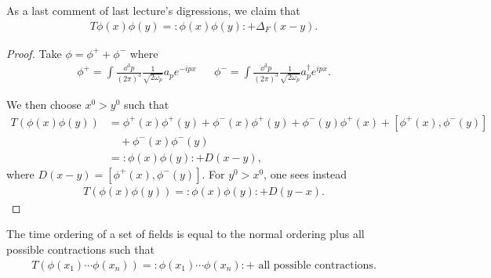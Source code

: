 

\newcommand{\nord}[1]{:\mathrel{#1}:}

\begin{claim}
    As a last comment of last lecture's digressions, we claim that
\begin{align}
    T \phi \left( x \right) \phi \left( y \right) = \nord{ \phi \left( x \right) \phi \left( y \right) } + \Delta_F \left( x - y \right) 
.\end{align}
\end{claim}


\begin{proof}
    Take $\phi = \phi^{+} + \phi^{-}$ where
    \begin{align}
        \phi^{+} = \int \frac{\dd{^3p}}{\left( 2\pi \right)^3} \frac{1}{\sqrt{2\omega_p} } a_p e^{-i p x} && \phi^{-} = \int \frac{\dd{^3p}}{\left( 2\pi \right)^3} \frac{1}{\sqrt{2\omega_p} } a_p^{\dag} e^{i px}
    .\end{align}

    We then choose $x^{0} > y^{0}$ such that
    \begin{align}
        T \left( \phi \left( x \right) \phi \left( y \right)  \right) &= \phi^{+} \left( x \right) \phi^{+} \left( y \right) + \phi^{-}\left( x \right) \phi^{+}\left( y \right) + \phi^{-}\left( y \right) \phi^{+}\left( x \right) + \left[ \phi^{+}\left( x \right) , \phi^{-}\left( y \right)  \right] \nonumber   \\
        &\quad + \phi^{-}\left( x \right) \phi^{-}\left( y \right) \\
        &=  \nord{ \phi \left( x \right) \phi \left( y \right)} + D \left( x - y \right)
    ,\end{align}
    where $D \left( x - y \right) = \left[ \phi^{+} \left( x \right) , \phi^{-}\left( y \right)  \right] $.
    For $y^{0} > x^{0}$, one sees instead
    \begin{align}
        T \left( \phi \left( x \right) \phi \left( y \right)  \right) = \nord{ \phi \left( x \right) \phi \left( y \right) } + D \left( y - x \right) 
    .\end{align}
\end{proof}


\begin{theorem}
    The time ordering of a set of fields is equal to the normal ordering plus all possible contractions such that
    \begin{align}
        T \left( \phi \left( x_1 \right) \cdots \phi \left( x_{n} \right)  \right) = \nord{ \phi \left( x_1 \right) \cdots \phi \left( x_{n} \right)} + \text{~all possible contractions}
    .\end{align}
\end{theorem}

